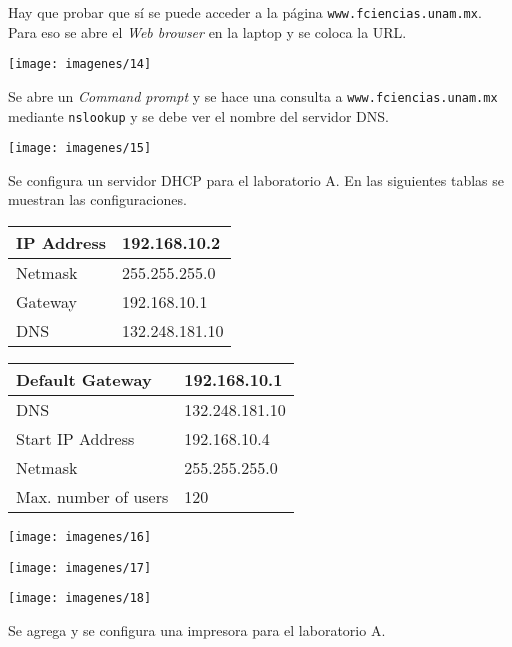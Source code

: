 \documentclass{article}
\begin{document}
Hay que probar que sí se puede acceder a la página \texttt{www.fciencias.unam.mx}. Para eso se abre el \textit{Web browser} en la laptop y se coloca la URL.

\begin{center}
\texttt{[image: imagenes/14]}
\end{center}

Se abre un \textit{Command prompt} y se hace una consulta a \texttt{www.fciencias.unam.mx} mediante \texttt{nslookup} y se debe ver el nombre del servidor DNS.

\begin{center}
\texttt{[image: imagenes/15]}
\end{center}

Se configura un servidor DHCP para el laboratorio A. En las siguientes tablas se muestran las configuraciones.

\begin{center}
\begin{tabular}{|l|l|}
\hline
IP Address & 192.168.10.2 \\ \hline
Netmask & 255.255.255.0 \\ \hline
Gateway & 192.168.10.1 \\ \hline
DNS & 132.248.181.10 \\ \hline
\end{tabular}
\end{center}

\begin{center}
\begin{tabular}{|l|l|}
\hline
Default Gateway & 192.168.10.1 \\ \hline
DNS & 132.248.181.10 \\ \hline
Start IP Address & 192.168.10.4 \\ \hline
Netmask & 255.255.255.0 \\ \hline
Max. number of users & 120 \\ \hline
\end{tabular}
\end{center}

\begin{center}
\texttt{[image: imagenes/16]}

\texttt{[image: imagenes/17]}

\texttt{[image: imagenes/18]}
\end{center}

Se agrega y se configura una impresora para el laboratorio A.
\end{document}
